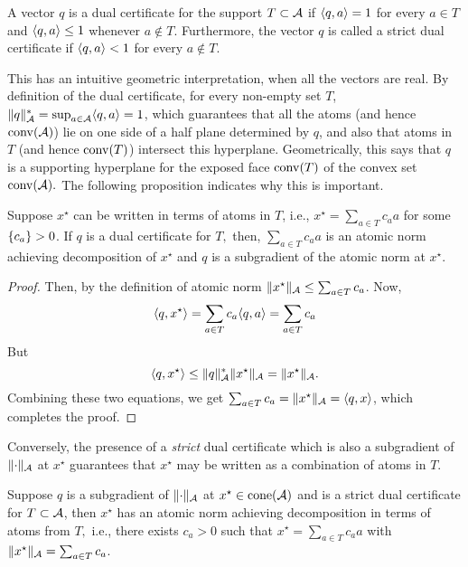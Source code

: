 \begin{definition}\label{def:dual-certificate}
A vector $q$ is a dual certificate for the support $T \subset \mathcal{A}$ if 
$\langle q, a\rangle = 1$ for every $a \in T$ and $\langle q, a\rangle \leq 1$ whenever $a \not\in T$. Furthermore, the vector $q$ is called a strict dual certificate if $\langle q, a\rangle < 1$ for every $a \not\in T.$
\end{definition}

This has an intuitive geometric interpretation, when all the vectors are real.
By definition of the dual certificate, for every non-empty set $T$,
$\lVert q\rVert_{\mathcal{A}}^* = \sup_{a \in \mathcal{A}} \langle q, a\rangle = 1$, which guarantees that all
the atoms (and hence $\operatorname{conv}(\mathcal{A})$) lie on one side of a half plane determined by
$q$, and also that atoms in $T$ (and hence $\operatorname{conv}(T)$) intersect this
hyperplane. Geometrically, this says that $q$ is a supporting hyperplane for the
exposed face $\operatorname{conv}(T)$ of the convex set $\operatorname{conv}(\mathcal{A}).$ The following proposition
indicates why this is important.

\begin{prop}
\label{prop:dual-certificate-is-subgrad}
Suppose $x^\star$ can be written in terms of atoms in $T$, i.e., $x^\star =
\sum_{a \in T} c_a a$ for some $\left\{ c_a \right\} > 0$. If $q$ is a dual certificate for
$T,$ then, $\sum_{a \in T} c_a a$ is an atomic norm achieving decomposition of
$x^\star$ and $q$ is a subgradient of the atomic norm at $x^\star.$
\end{prop}
\begin{proof}
	Then, by the definition of atomic norm $\lVert x^\star\rVert_{\mathcal{A}} \leq \sum_{a \in T} c_a$. Now, 
	\[
		\langle q, x^\star\rangle = \sum_{a \in T} c_a\langle q, a\rangle = \sum_{a \in T} c_a
	\]
	But 
	\[
		\langle q, x^\star\rangle \leq \lVert q\rVert_{\mathcal{A}}^* \lVert x^\star\rVert_{\mathcal{A}} = \lVert x^\star\rVert_{\mathcal{A}}.
	\]
	Combining these two equations, we get $\sum_{a \in T} c_a = \lVert x^\star\rVert_{\mathcal{A}} =
	\langle q, x\rangle$, which completes the proof.
\end{proof}

Conversely, the presence of a \emph{strict} dual certificate which is also a
subgradient of $\lVert\cdot\rVert_{\mathcal{A}}$ at $x^\star$ guarantees that $x^\star$ may be
written as a combination of atoms in $T.$ 

\begin{prop}\label{prop:certificate-support}
Suppose $q$ is a subgradient of $\lVert\cdot\rVert_{\mathcal{A}}$ at $x^\star \in \operatorname{cone}(\mathcal{A})$
and is a strict dual certificate for $T \subset \mathcal{A}$, then $x^\star$ has an
atomic norm achieving decomposition in terms of atoms from $T,$ i.e., there
exists $c_a > 0$ such that $x^\star = \sum_{a \in T}c_a a$ with
$\lVert x^\star\rVert_{\mathcal{A}} = \sum_{a \in T}c_a$.
\end{prop}

